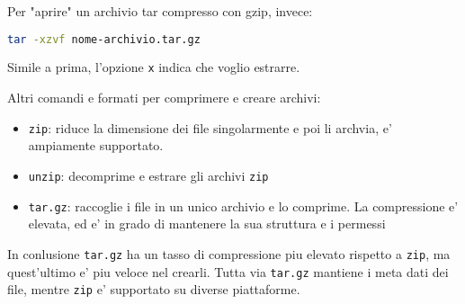 Per "aprire" un archivio tar compresso con gzip, invece:
\begin{lstlisting}[language=bash]
    tar -xzvf nome-archivio.tar.gz
\end{lstlisting}
Simile a prima, l'opzione \texttt{x} indica che voglio estrarre. 

Altri comandi e formati per comprimere e creare archivi:
\begin{itemize}
    \item \texttt{zip}: riduce la dimensione dei file singolarmente e poi li archvia, e' ampiamente supportato.
    \item \texttt{unzip}: decomprime e estrare gli archivi \texttt{zip}
    \item \texttt{tar.gz}: raccoglie i file in un unico archivio e lo comprime. La compressione e' elevata, ed e' in grado di mantenere la sua struttura e i permessi
\end{itemize}

In conlusione \texttt{tar.gz} ha un tasso di compressione piu elevato rispetto a \texttt{zip}, ma quest'ultimo e' piu veloce nel crearli.
Tutta via \texttt{tar.gz} mantiene i meta dati dei file, mentre \texttt{zip} e' supportato su diverse piattaforme.